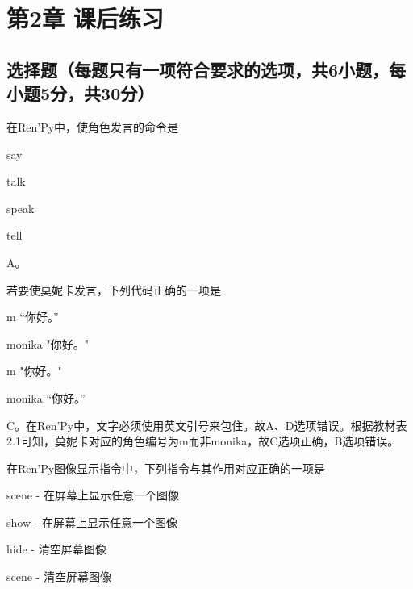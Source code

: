 \documentclass[../Exercises.tex]{subfiles}
\begin{document}
    \chapter{第2章 课后练习}
    \section{选择题（每题只有一项符合要求的选项，共6小题，每小题5分，共30分）}
    \begin{question}
        在Ren'Py中，使角色发言的命令是 \paren
        \begin{choices}
            \item say
            \item talk
            \item speak
            \item tell
        \end{choices}
    \end{question}

    \begin{solution}[pre-analysis=【答案】]
        A。
    \end{solution}

    \begin{question}
        若要使莫妮卡发言，下列代码正确的一项是 \paren
        \begin{choices}
            \item m “你好。”
            \item monika \textsf{"}你好。\textsf{"}
            \item m \textsf{"}你好。\textsf{"}
            \item monika “你好。”
        \end{choices}
    \end{question}

    \begin{solution}
        C。在Ren'Py中，文字必须使用英文引号来包住。故A、D选项错误。根据教材表2.1可知，莫妮卡对应的角色编号为m而非monika，故C选项正确，B选项错误。
    \end{solution}

    \begin{question}
        在Ren'Py图像显示指令中，下列指令与其作用对应正确的一项是\paren
        \begin{choices}
            \item scene - 在屏幕上显示任意一个图像
            \item show - 在屏幕上显示任意一个图像
            \item hide - 清空屏幕图像
            \item scene - 清空屏幕图像
        \end{choices}
    \end{question}
\end{document}
